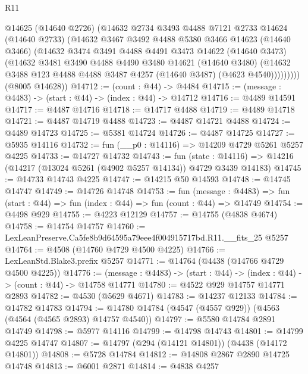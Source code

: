 \begin{lexlean}{R11}
\begin{coremodule}
            @14625
            (@14640 @2726)
            (@14632
              @2734
              @3493
              @4488
              @7121
              @2733
              @14624
              (@14640 @2733)
              (@14632
                @3467
                @3492
                @4488
                @5380
                @3466
                @14623
                (@14640 @3466)
                (@14632
                  @3474
                  @3491
                  @4488
                  @4491
                  @3473
                  @14622
                  (@14640 @3473)
                  (@14632
                    @3481
                    @3490
                    @4488
                    @4490
                    @3480
                    @14621
                    (@14640 @3480)
                    (@14632 @3488 @123 @4488 @4488 @3487 @4257 (@14640 @3487) (@4623 @4540)))))))))
      (@8005 @14628))
@14712 := (count : @44) -> @4484
@14715 := (message : @4483) -> (start : @44) -> (index : @44) -> @14712
@14716 := @4489 @14591
@14717 := @4487 @14716
@14718 := @14717 @4488
@14719 := @4489 @14718
@14721 := @4487 @14719 @4488
@14723 := @4487 @14721 @4488
@14724 := @4489 @14723
@14725 := @5381 @14724
@14726 := @4487 @14725
@14727 := @5935 @14116
@14732 := fun (__p0 : @14116) => @14209 @4729 @5261 @5257 @4225
@14733 := @14727 @14732
@14743 := fun (state : @14116) =>
  @14216 (@14217 (@13024 @5261 (@4902 @5257 @14134)) @4729 @3439 @14183)
@14745 := @14733 @14743 @4225
@14747 := @14215 @50 @14593
@14748 := @14745 @14747
@14749 := @14726 @14748
@14753 := fun (message : @4483) =>
  fun (start : @44) => fun (index : @44) => fun (count : @44) => @14749
@14754 := @4498 @929
@14755 := @4223 @12129
@14757 := @14755 (@4838 @4674)
@14758 := @14754 @14757
@14760 := LexLeanPreserve.Ca5fe8b9d64595a79eee4f004915717bd.R11.__fits_25 @5257
@14764 := @4508 (@14760 @4729 @4500 @4225)
@14766 := LexLeanStd.Blake3.prefix @5257
@14771 := @14764 (@4438 (@14766 @4729 @4500 @4225))
@14776 := (message : @4483) -> (start : @44) -> (index : @44) -> (count : @44) -> @14758 @14771
@14780 := @4522 @929 @14757 @14771 @2893
@14782 := @4530 (@5629 @4671)
@14783 := @14237 @12133
@14784 := @14782 @14783
@14794 := @14780 @14784 (@4547 (@4557 @929)) (@4563 (@4564 (@4565 @2893) @14757 @4540))
@14797 := @5580 @14784 @2891 @14749
@14798 := @5977 @14116
@14799 := @14798 @14743
@14801 := @14799 @4225 @14747
@14807 := @14797 (@294 (@14121 @14801)) (@4438 (@14172 @14801))
@14808 := @5728 @14784
@14812 := @14808 @2867 @2890 @14725 @14748
@14813 := @6001 @2871
@14814 := @4838 @4257

\end{coremodule}
\end{lexlean}
